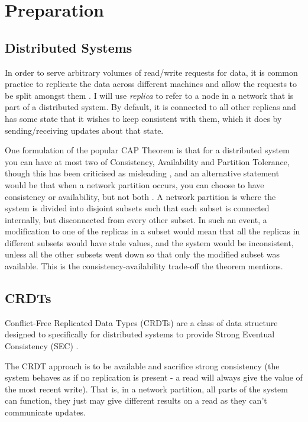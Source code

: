 \documentclass[diss.tex]{subfiles}
\begin{document}
\chapter{Preparation}\label{chap:preparation}

\section{Distributed Systems}

In order to serve arbitrary volumes of read/write requests for data, it is common practice to replicate the data across different machines and allow the requests to be split amongst them \cite{baconOS}. I will use \textit{replica} to refer to a node in a network that is part of a distributed system. By default, it is connected to all other replicas and has some state that it wishes to keep consistent with them, which it does by sending/receiving updates about that state. 

One formulation of the popular CAP Theorem \cite{CAP} is that for a distributed system you can have at most two of Consistency, Availability and Partition Tolerance, though this has been criticised as misleading \cite{brewer}, and an alternative statement would be that when a network partition occurs, you can choose to have consistency or availability, but not both \cite{kleppmann}. A network partition is where the system is divided into disjoint subsets such that each subset is connected internally, but disconnected from every other subset. In such an event, a modification to one of the replicas in a subset would mean that all the replicas in different subsets would have stale values, and the system would be inconsistent, unless all the other subsets went down so that only the modified subset was available. This is the consistency-availability trade-off the theorem mentions.

\section{CRDTs}
Conflict-Free Replicated Data Types (CRDTs) are a class of data structure designed to specifically for distributed systems to provide Strong Eventual Consistency (SEC) \cite{crdt}. 

The CRDT approach is to be available and sacrifice strong consistency (the system behaves as if no replication is present - a read will always give the value of the most recent write). That is, in a network partition, all parts of the system can function, they just may give different results on a read as they can't communicate updates.
\end{document}
